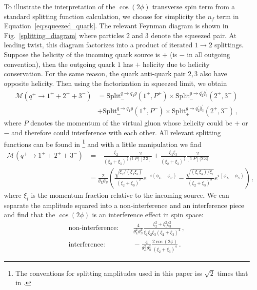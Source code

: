 \documentclass[letterpaper,11pt]{article}
\def\beq{\begin{equation}}
\def\eeq{\end{equation}}
\def\bea{\begin{eqnarray}}
\def\eea{\end{eqnarray}}
\newcommand{\Eq}[1]{Equation~\eqref{#1}}
\DeclareRobustCommand{\Fig}[1]{Fig.~\ref{#1}}
\DeclareRobustCommand{\Eq}[1]{Eq.~(\ref{#1})}
\def\beq{\begin{equation}}
\def\eeq{\end{equation}}
\begin{document}
To illustrate the interpretation of the $\cos(2\phi)$ transverse spin term from a standard splitting function calculation, we choose for simplicity the $n_f$ term in  \Eq{eq:squeezed_quark}. The relevant Feynman diagram is shown in \Fig{splitting_diagram} where particles $2$ and $3$ denote the squeezed pair. At leading twist, this diagram factorizes into a product of iterated $1\to 2$ splittings. Suppose the helicity of the incoming quark source is $+$ (is $-$ in all outgoing convention), then the outgoing quark $1$ has $+$ helicity due to helicity conservation. For the same reason, the quark anti-quark pair $2,3$ also have opposite helicity. Then using the factorization in squeezed limit, we obtain
\beq
\begin{split}
\mathcal{M}(q^+\to 1^+ + 2^+ + 3^-)&=\mathrm{Split}_{-}^{q\to q_1 g}(1^+, P^+) \times \mathrm{Split}_{-}^{g\to q_2^\prime \bar{q}_3^\prime}(2^+,3^-)\\
&+ \mathrm{Split}_{-}^{q\to q_1 g}(1^+, P^-) \times \mathrm{Split}_{+}^{g\to q_2^\prime \bar{q}_3^\prime}(2^+,3^-)\,,
\end{split}
\eeq
where $P$ denotes the momentum of the virtual gluon whose helicity could be $+$ or $-$ and therefore could interference with each other. All relevant splitting functions can be found in \cite{Bern:1999ry}\footnote{The conventions for splitting amplitudes used in this paper iss $\sqrt{2}$ times that in \cite{Bern:1999ry}. }  
and with a little manipulation we find
\beq
\begin{split}
\mathcal{M}(q^+\to 1^+ + 2^+ + 3^-)&= -\frac{\xi_2}{(\xi_2+\xi_3)^{\frac{3}{2}}}\frac{2}{\langle1\, P\rangle \left[2\,3\right]}+ \frac{\xi_1 \xi_3}{(\xi_2+\xi_3)^{\frac{3}{2}}}\frac{2}{\left[1\, P\right] \langle 2\,3\rangle}\\
&= \frac{2}{\theta_L \theta_S}\left(\frac{\sqrt{\xi_2/(\xi_1 \xi_3)}}{(\xi_2+\xi_3)^2}e^{-i(\phi_L-\phi_S)} - \frac{\sqrt{(\xi_1 \xi_3)/\xi_1}}{(\xi_2+\xi_3)^2}e^{i(\phi_L-\phi_S)}\right)\,,
\end{split}
\eeq
where $\xi_i$ is the momentum fraction relative to the incoming source. We can separate the amplitude squared into a non-interference and an interference piece and find that the $\cos(2\phi)$ is an interference effect in spin space:
\bea
\text{non-interference: }&\quad \frac{4}{\theta_L^2\theta_S^2}\frac{\xi_2^2 +\xi_1^2 \xi_3^2}{\xi_1\xi_2\xi_3 (\xi_2+\xi_3)^4}\,,\\
\text{interference: }&\quad  -\frac{4}{\theta_L^2\theta_S^2}\frac{2\cos\left(2\phi\right)}{(\xi_2+\xi_3)^4}\,.
\eea
\end{document}
